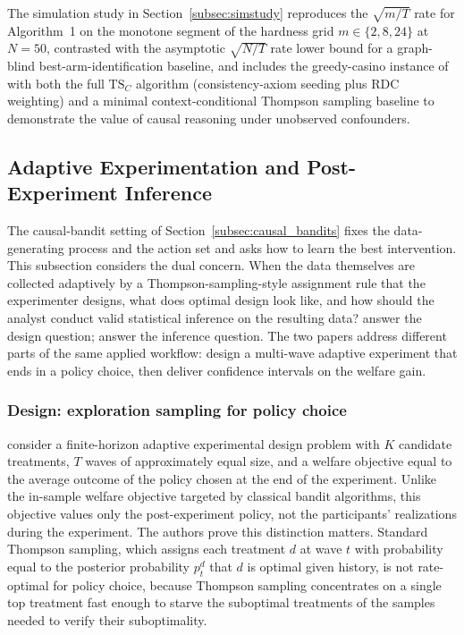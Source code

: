 The simulation study in Section~\ref{subsec:simstudy} reproduces the $\sqrt{m/T}$ rate for Algorithm~1 on the monotone segment of the hardness grid $m \in \{2, 8, 24\}$ at $N = 50$, contrasted with the asymptotic $\sqrt{N/T}$ rate lower bound for a graph-blind best-arm-identification baseline, and includes the greedy-casino instance of \citet{bareinboim2015mabuc} with both the full $\mathrm{TS}_C$ algorithm (consistency-axiom seeding plus RDC weighting) and a minimal context-conditional Thompson sampling baseline to demonstrate the value of causal reasoning under unobserved confounders.

\subsection{Adaptive Experimentation and Post-Experiment Inference}
\label{subsec:adaptive_experiments}

The causal-bandit setting of Section~\ref{subsec:causal_bandits} fixes the data-generating process and the action set and asks how to learn the best intervention. This subsection considers the dual concern. When the data themselves are collected adaptively by a Thompson-sampling-style assignment rule that the experimenter designs, what does optimal design look like, and how should the analyst conduct valid statistical inference on the resulting data? \citet{kasy2021adaptive} answer the design question; \citet{hadad2021adaptive} answer the inference question. The two papers address different parts of the same applied workflow: design a multi-wave adaptive experiment that ends in a policy choice, then deliver confidence intervals on the welfare gain.

\subsubsection*{Design: exploration sampling for policy choice}

\citet{kasy2021adaptive} consider a finite-horizon adaptive experimental design problem with $K$ candidate treatments, $T$ waves of approximately equal size, and a welfare objective equal to the average outcome of the policy chosen at the end of the experiment. Unlike the in-sample welfare objective targeted by classical bandit algorithms, this objective values only the post-experiment policy, not the participants' realizations during the experiment. The authors prove this distinction matters. Standard Thompson sampling, which assigns each treatment $d$ at wave $t$ with probability equal to the posterior probability $p_t^d$ that $d$ is optimal given history, is not rate-optimal for policy choice, because Thompson sampling concentrates on a single top treatment fast enough to starve the suboptimal treatments of the samples needed to verify their suboptimality.

